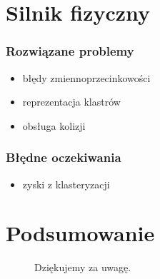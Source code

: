 \documentclass{beamer}
\begin{document}
\section{Silnik fizyczny}\label{sec:silnik fizyczny}

\frame
{
	\tableofcontents[currentsection]
}

\frame
{
	\frametitle{Rozwiązane problemy}
	\begin{itemize}
	\item błędy zmiennoprzecinkowości
	\item reprezentacja klastrów
	\item obsługa kolizji
	\end{itemize}
}

\frame
{
	\frametitle{Błędne oczekiwania}
	\begin{itemize}
	\item zyski z klasteryzacji
	\end{itemize}
}

\section{Podsumowanie}\label{sec:podsumowanie}

\frame
{
	\begin{figure}
	\centering
	Dziękujemy za uwagę.
	\end{figure}
}
\end{document}
